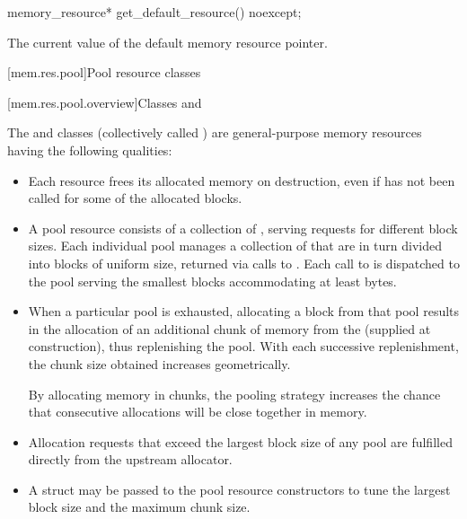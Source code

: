 %
\begin{itemdecl}
memory_resource* get_default_resource() noexcept;
\end{itemdecl}

\begin{itemdescr}
\pnum
\returns
The current value of the default memory resource pointer.
\end{itemdescr}

[mem.res.pool]{Pool resource classes}

[mem.res.pool.overview]{Classes  and }

\pnum
The  and
 classes
(collectively called )
are general-purpose memory resources having the following qualities:
\begin{itemize}
\item
Each resource frees its allocated memory on destruction,
even if  has not been called for some of the allocated blocks.
\item
A pool resource consists of a collection of ,
serving requests for different block sizes.
Each individual pool manages a collection of 
that are in turn divided into blocks of uniform size,
returned via calls to .
Each call to  is dispatched
to the pool serving the smallest blocks accommodating at least  bytes.
\item
When a particular pool is exhausted,
allocating a block from that pool results in the allocation
of an additional chunk of memory from the 
(supplied at construction), thus replenishing the pool.
With each successive replenishment,
the chunk size obtained increases geometrically.
\begin{note}
By allocating memory in chunks,
the pooling strategy increases the chance that consecutive allocations
will be close together in memory.\end{note}
\item
Allocation requests that exceed the largest block size of any pool
are fulfilled directly from the upstream allocator.
\item
A  struct may be passed to the pool resource constructors
to tune the largest block size and the maximum chunk size.
\end{itemize}

